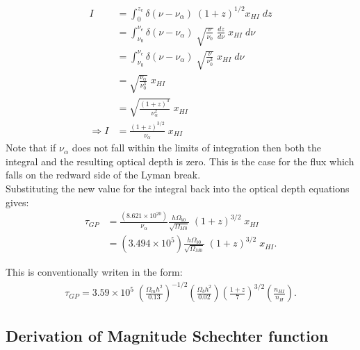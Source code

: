 \documentclass[pdf,color]{UoBnote}
\begin{document}
\begin{align}
			I &=  \int_0^{z_e} \delta(\nu - \nu_\alpha) \;  (1+z)^{1/2} x_{HI}\; dz \\ 
			  &=  \int_{\nu_0}^{\nu_e} \delta(\nu - \nu_\alpha) \;  \sqrt{\frac{\nu}{\nu_0}} \; \frac{dz}{d\nu} \; x_{HI}\; d\nu \\
			  &=  \int_{\nu_0}^{\nu_e} \delta(\nu - \nu_\alpha) \;  \sqrt{\frac{\nu}{\nu_0^3}} \; x_{HI}\; d\nu \\ 
			  &=  \sqrt{\frac{\nu_\alpha}{\nu_0^3}} \; x_{HI} \\
			  &=  \sqrt{ \frac{(1+z)^3}{\nu_\alpha^2}}\; x_{HI} \\
	\Rightarrow	I &=  \frac{(1+z)^{3/2}}{\nu_\alpha}\; x_{HI}
\end{align}
Note that if $\nu_\alpha$ does not fall within the limits of integration then both the integral and the resulting optical depth is zero. This is the case for the flux which falls on the redward side of the Lyman break. \\

Substituting the new value for the integral back into the optical depth equations gives:
\begin{align}
			\tau_{GP} &=  \frac{(8.621\times 10^{20} )}{\nu_\alpha} \frac{h \Omega_{b0}}{\sqrt{\Omega_{M0}}} \; (1+z)^{3/2} \; x_{HI} \\
				       &=  (3.494 \times 10^{5}) \frac{h \Omega_{b0}}{\sqrt{\Omega_{M0}}} \; (1+z)^{3/2} \; x_{HI}.
\end{align}

This is conventionally writen in the form:
\begin{align}
			\tau_{GP} = 3.59 \times 10^5 \; 	\left ( 	\frac{\Omega_m h^2}{0.13}	\right ) ^{-1/2}	
								\left ( 	\frac{\Omega_b h^2}{0.02}	\right ) 	
								\left ( 	\frac{1+z}{7}			\right )^{3/2} 	
								\left ( 	\frac{n_{HI}}{n_H}			\right ) .
\end{align}

\newpage

\subsection{Derivation of Magnitude Schechter function}
\end{document}
